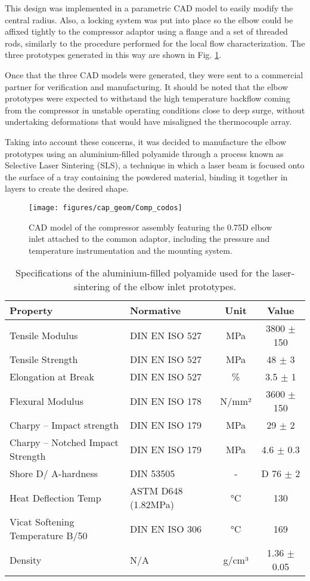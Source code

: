 This design was implemented in a parametric CAD model to easily modify the central radius. Also, a locking system was put into place so the elbow could be affixed tightly to the compressor adaptor using a flange and a set of threaded rods, similarly to the procedure performed for the local flow characterization. The three prototypes generated in this way are shown in Fig. \ref{fig:Comp_codos}.

Once that the three CAD models were generated, they were sent to a commercial partner for verification and manufacturing. It should be noted that the elbow prototypes were expected to withstand the high temperature backflow coming from the compressor in unstable operating conditions close to deep surge, without undertaking deformations that would have misaligned the thermocouple array.

Taking into account these concerns, it was decided to manufacture the elbow prototypes using an aluminium-filled polyamide through a process known as Selective Laser Sintering (SLS), a technique in which a laser beam is focused onto the surface of a tray containing the powdered material, binding it together in layers to create the desired shape. 

\begin{figure}[t!]
\centering
\texttt{[image: figures/cap\_geom/Comp\_codos]}
\caption{CAD model of the compressor assembly featuring the 0.75D elbow inlet attached to the common adaptor, including the pressure and temperature instrumentation and the mounting system.}
\label{fig:Comp_codos}
\end{figure}

\begin{table}[b!]
  \centering
  \caption{Specifications of the aluminium-filled polyamide used for the laser-sintering of the elbow inlet prototypes.}
  	\footnotesize
    \begin{tabular}{llcc}
    \addlinespace
    \toprule
    \bf Property & \bf Normative & \bf Unit & \bf Value \\
    \midrule
    Tensile Modulus & DIN EN ISO 527 & MPa   & 3800 $\pm$ 150 \\
    Tensile Strength & DIN EN ISO 527 & MPa   & 48 $\pm$ 3 \\
    Elongation at Break & DIN EN ISO 527 & \%    & 3.5 $\pm$ 1 \\
    Flexural Modulus & DIN EN ISO 178 & N/mm² & 3600 $\pm$ 150 \\
    Charpy – Impact strength & DIN EN ISO 179 & MPa   & 29 $\pm$ 2 \\
    Charpy – Notched Impact Strength & DIN EN ISO 179 & MPa   & 4.6 $\pm$ 0.3 \\
    Shore D/ A-hardness & DIN 53505 &   -   & D 76 $\pm$ 2 \\
    Heat Deflection Temp & ASTM D648
(1.82MPa) & °C    & 130 \\
    Vicat Softening Temperature B/50 & DIN EN ISO 306 & °C    & 169 \\
    Density &   N/A    & g/cm³ & 1.36 $\pm$ 0.05 \\
    \bottomrule
    \end{tabular}
  \label{tab:alumide_data}
\end{table}

